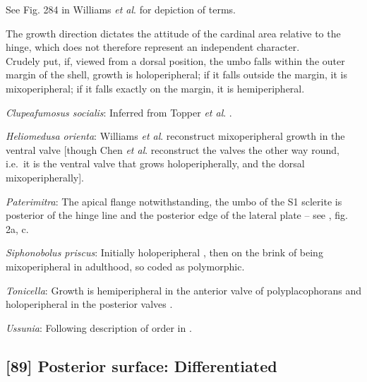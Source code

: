 \documentclass[openany]{book}
\theoremstyle{definition}
\theoremstyle{definition}
\theoremstyle{definition}
\theoremstyle{remark}
\begin{document}
See Fig. 284 in Williams \emph{et al}.
\citeyearpar{Williams1997Introduction} for depiction of terms.

The growth direction dictates the attitude of the cardinal area relative
to the hinge, which does not therefore represent an independent
character.\\
Crudely put, if, viewed from a dorsal position, the umbo falls within
the outer margin of the shell, growth is holoperipheral; if it falls
outside the margin, it is mixoperipheral; if it falls exactly on the
margin, it is hemiperipheral.

\hypertarget{Clupeafumosus_socialis-coding-88}{}
\emph{Clupeafumosus socialis}: Inferred from Topper \emph{et al}.
\citeyearpar{Topper2013Reappraisalof}.

\hypertarget{Heliomedusa_orienta-coding-88}{}
\emph{Heliomedusa orienta}: Williams \emph{et al}.
\citeyearpar[2007]{Williams2000LinguliformeaCraniiformea} reconstruct
mixoperipheral growth in the ventral valve {[}though Chen \emph{et al}.
\citeyearpar{Chen2007Reinterpretationof} reconstruct the valves the
other way round, i.e.~it is the ventral valve that grows
holoperipherally, and the dorsal mixoperipherally{]}.

\hypertarget{Paterimitra-coding-88}{}
\emph{Paterimitra}: The apical flange notwithstanding, the umbo of the
S1 sclerite is posterior of the hinge line and the posterior edge of the
lateral plate -- see \citet{Larsson2014iPaterimitra}, fig. 2a, c.

\hypertarget{Siphonobolus_priscus-coding-88}{}
\emph{Siphonobolus priscus}: Initially holoperipheral
\citep[p.~159]{Popov2009Earlyontogeny}, then on the brink of being
mixoperipheral in adulthood, so coded as polymorphic.

\hypertarget{Tonicella-coding-88}{}
\emph{Tonicella}: Growth is hemiperipheral in the anterior valve of
polyplacophorans and holoperipheral in the posterior valves
\citep{Schwabe2010, Connors2012}.

\hypertarget{Ussunia-coding-88}{}
\emph{Ussunia}: Following description of order in
\citet{Williams2000LinguliformeaCraniiformea}.

\subsection*{{[}89{]} Posterior surface:
Differentiated}\label{posterior-surface-differentiated-1}
\end{document}
